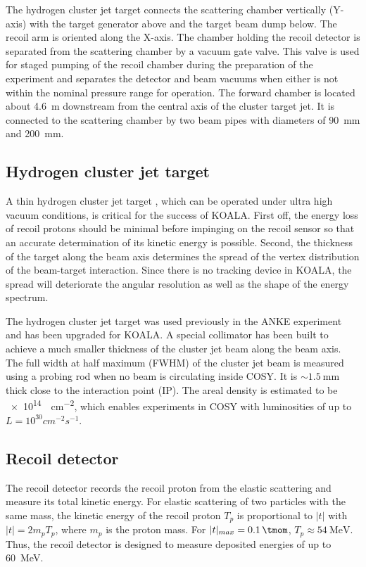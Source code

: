 \documentclass[number,5p]{elsarticle}
\begin{document}
The hydrogen cluster jet target connects the scattering chamber vertically (Y-axis) with the target generator above and the target beam dump below.
The recoil arm is oriented along the X-axis.
The chamber holding the recoil detector is separated from the scattering chamber by a vacuum gate valve.
This valve is used for staged pumping of the recoil chamber during the
preparation of the experiment and separates the detector and beam vacuums when
either is not within the nominal pressure range for operation.
The forward chamber is located about \SI{4.6}{\meter} downstream from the
central axis of the cluster target jet.
It is connected to the scattering chamber by two beam pipes with diameters of \SI{90}{\mm} and \SI{200}{\mm}.
\subsection{Hydrogen cluster jet target}
\label{sec:target}

A thin hydrogen cluster jet target \cite{cluster_target, cluster_target_new}, which can be operated under ultra high vacuum conditions, is critical for the success of KOALA.
First off, the energy loss of recoil protons should be minimal before impinging
on the recoil sensor so that an accurate determination of its kinetic energy is possible.
Second, the thickness of the target along the beam axis determines
the spread of the vertex distribution of the beam-target interaction.
Since there is no tracking device in KOALA, the spread will deteriorate the
angular resolution as well as the shape of the energy spectrum.

The hydrogen cluster jet target was used previously in the ANKE experiment and has been upgraded for KOALA.
A special collimator has been built to achieve a much
smaller thickness of the cluster jet beam along the beam axis.
The full width at half maximum (FWHM) of the cluster jet beam is measured
using a probing rod when no beam is circulating inside COSY.
It is $\sim\SI{1.5}{\mm}$ thick close to the interaction point (IP).
The areal density is estimated to be \SI{e14}{\atom\per\cm\squared}, which
enables experiments in COSY with luminosities of up to $L = 10^{30}\si{cm^{-2}s^{-1}}$.

\subsection{Recoil detector}
\label{sec:recoil}

The recoil detector records the recoil proton from the
elastic scattering and measure its total kinetic energy.
For elastic scattering of two particles with the same mass,
the kinetic energy of the recoil proton \(T_p\) is proportional to $|t|$ with \(|t| = 2m_pT_p\), where \(m_p\) is the proton mass.
For $|t|_{max}=\SI{0.1}{\tmom}$, \(T_p \approx \SI{54}{\MeV}\).
Thus, the recoil detector is designed to measure deposited energies of up to \SI{60}{\MeV}.
\end{document}
